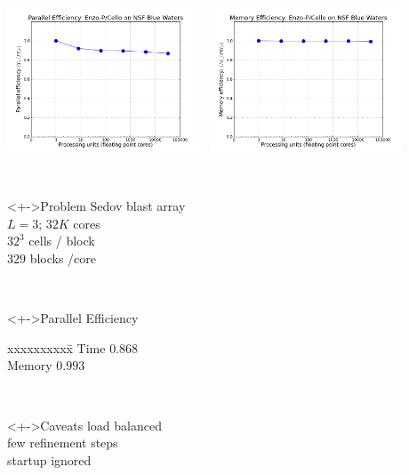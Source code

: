 \begin{frame}[fragile,label=ss-scaling] 
\secframetitle{\ssScaling}
\begin{center}
\begin{minipage}{4.50in}
\includegraphics[width=2.25in]{Images/Scaling/scale-eff.png} \ 
\includegraphics[width=2.25in]{Images/Scaling/scale-mem.png}
\end{minipage} \\
\begin{minipage}{4.0in}
\footnotesize
\pause
\begin{minipage}[t]{1.20in}
\blockblue
\begin{block}<+->{Problem}
Sedov blast array \\
$L=3$; $32K$ cores \\
$32^3$ cells / block \\
$329$ blocks /core
\end{block}
\end{minipage} \
\begin{minipage}[t]{1.20in}
\blockgreen
\begin{block}<+->{Parallel Efficiency}
\begin{tabbing}
xxxxxxxxxx\=\kill
Time \> $0.868$ \\
Memory \> $0.993$
\end{tabbing}
\end{block}
\end{minipage} \
\begin{minipage}[t]{1.20in}
\blockred
\begin{block}<+->{Caveats}
load balanced \\
few refinement steps \\
startup ignored
\end{block}
\end{minipage}
\end{minipage}
\end{center}
\end{frame}
